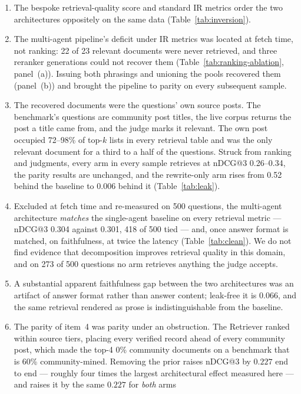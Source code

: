 \documentclass[acmsmall,review,anonymous,screen]{acmart}
\begin{document}
\begin{enumerate}
  \item The bespoke retrieval-quality score and standard IR metrics order the
  two architectures oppositely on the same data (Table~\ref{tab:inversion}).
  \item The multi-agent pipeline's deficit under IR metrics was located at
  fetch time, not ranking: 22 of 23 relevant documents were never retrieved,
  and three reranker generations could not recover them
  (Table~\ref{tab:ranking-ablation}, panel~(a)). Issuing both phrasings and
  unioning the pools recovered them (panel~(b)) and brought the pipeline to
  parity on every subsequent sample.
  \item The recovered documents were the questions' own source posts. The
  benchmark's questions are community post titles, the live corpus returns the
  post a title came from, and the judge marks it relevant. The own post
  occupied 72--98\% of top-$k$ lists in every retrieval table and was the only
  relevant document for a third to a half of the questions. Struck from ranking
  and judgments, every arm in every sample retrieves at nDCG@3 0.26--0.34, the
  parity results are unchanged, and the rewrite-only arm rises from 0.52
  behind the baseline to 0.006 behind it (Table~\ref{tab:leak}).
  \item Excluded at fetch time and re-measured on 500 questions, the
  multi-agent architecture \emph{matches} the single-agent baseline on every
  retrieval metric --- nDCG@3 0.304 against 0.301, 418 of 500 tied --- and, once
  answer format is matched, on faithfulness, at twice the latency
  (Table~\ref{tab:clean}). We do not find evidence that decomposition improves
  retrieval quality in this domain, and on 273 of 500 questions no arm
  retrieves anything the judge accepts.
  \item A substantial apparent faithfulness gap between the two architectures
  was an artifact of answer format rather than answer content; leak-free it is
  0.066, and the same retrieval rendered as prose is indistinguishable from the
  baseline.
  \item The parity of item~4 was parity under an obstruction. The Retriever
  ranked within source tiers, placing every verified record ahead of every
  community post, which made the top-4 0\% community documents on a benchmark
  that is 60\% community-mined. Removing the prior raises nDCG@3 by $0.227$ end
  to end --- roughly four times the largest architectural effect measured here
  --- and raises it by the same $0.227$ for \emph{both} arms

\end{enumerate}
\end{document}
